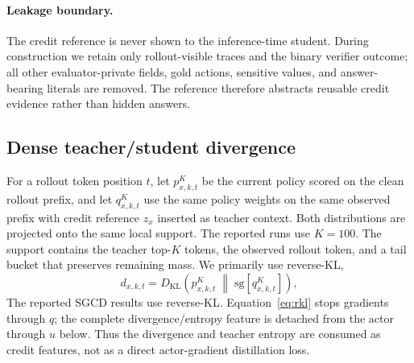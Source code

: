 \paragraph{Leakage boundary.} The credit reference is never shown to the
inference-time student. During construction we retain only rollout-visible
traces and the binary verifier outcome; all other evaluator-private fields,
gold actions, sensitive values, and answer-bearing literals are removed. The
reference therefore abstracts reusable credit evidence rather than hidden
answers.

\subsection{Dense teacher/student divergence}
\label{sec:dense}
For a rollout token position $t$, let $p_{x,k,t}^{K}$ be the current policy
scored on the clean rollout prefix, and let $q_{x,k,t}^{K}$ use the same policy
weights on the same observed prefix with credit reference $z_x$ inserted as
teacher context. Both distributions are projected onto the same local support.
The reported runs use $K{=}100$. The support
contains the teacher top-$K$ tokens, the observed rollout token, and a tail
bucket that preserves remaining mass. We primarily use reverse-KL,
\begin{equation}
  d_{x,k,t}
  = D_{\mathrm{KL}}\!\left(
      p_{x,k,t}^{K} \;\middle\|\; \mathrm{sg}[q_{x,k,t}^{K}]
    \right),
  \label{eq:rkl}
\end{equation}
The reported SGCD results use reverse-KL. Equation~\ref{eq:rkl} stops gradients
through $q$; the complete divergence/entropy feature is detached from the actor
through $u$ below. Thus the divergence and teacher entropy are consumed as
credit features, not as a direct actor-gradient distillation loss.

